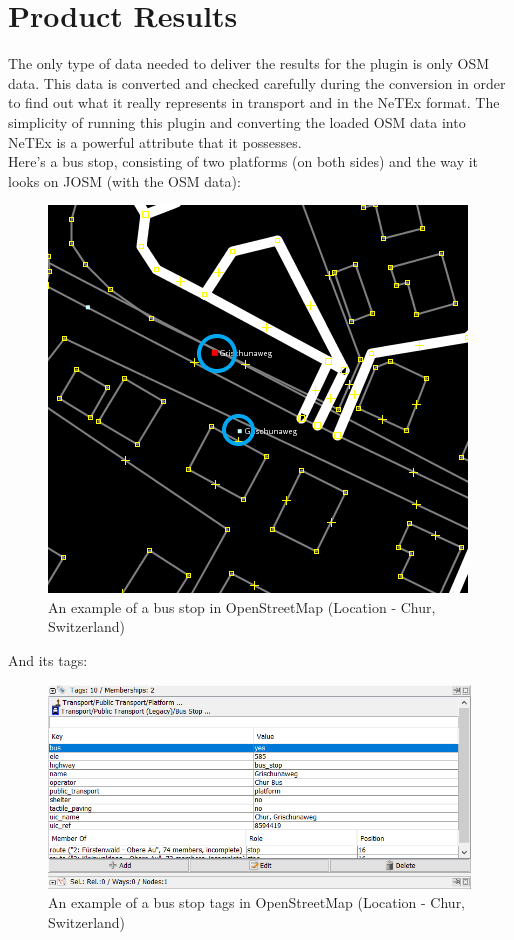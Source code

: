\section{Product Results}
The only type of data needed to deliver the results for the plugin is only OSM data. This data is converted and checked carefully during the conversion in order to find out what it really represents in transport and in the NeTEx format. The simplicity of running this plugin and converting the loaded OSM data into NeTEx is a powerful attribute that it possesses.\\
\newline
Here's a bus stop, consisting of two platforms (on both sides) and the way it looks on JOSM (with the OSM data):
\begin{figure}[H]
	\includegraphics[width=\linewidth]{./Images/Results/results_osm_example_1.png}
	\caption{An example of a bus stop in OpenStreetMap (Location - Chur, Switzerland)}
\end{figure}
And its tags:
\begin{figure}[H]
	\includegraphics[width=\linewidth]{./Images/Results/results_osm_example_2.png}
	\caption{An example of a bus stop tags in OpenStreetMap (Location - Chur, Switzerland)}
\end{figure}
